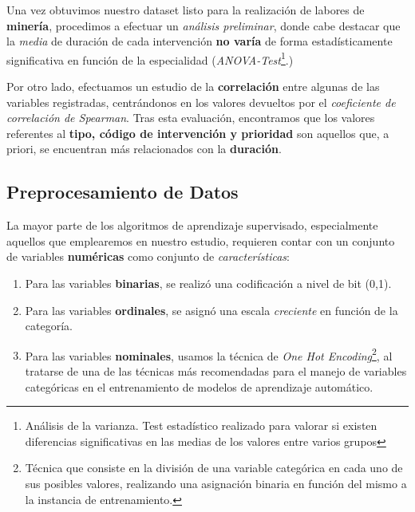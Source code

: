 

 Una vez obtuvimos nuestro dataset listo para la realización de labores de \textbf{minería}, procedimos a efectuar un \textit{análisis preliminar}, donde cabe destacar que la \textit{media} de duración de cada intervención \textbf{no varía} de forma estadísticamente significativa en función de la especialidad (\textit{ANOVA-Test}\footnote{Análisis de la varianza. Test estadístico realizado para valorar si existen diferencias significativas en las medias de los valores entre varios grupos}.)


 Por otro lado, efectuamos un estudio de la \textbf{correlación} entre algunas de las variables registradas, centrándonos en los valores devueltos por el \textit{coeficiente de correlación de Spearman}\cite{Page1963OrderedRanks}. 
 Tras esta evaluación, encontramos que los valores referentes al \textbf{tipo, código de intervención y prioridad} son aquellos que, a priori, se encuentran más relacionados con la \textbf{duración}.



 \subsection{Preprocesamiento de Datos}

 La mayor parte de los algoritmos de aprendizaje supervisado, especialmente aquellos que emplearemos en nuestro estudio, requieren contar con un conjunto de variables \textbf{numéricas} como conjunto de \textit{características}:
 
 \begin{enumerate}
     \item Para las variables \textbf{binarias}, se realizó una codificación a nivel de bit (0,1).
     \item Para las variables \textbf{ordinales}, se asignó una escala \textit{creciente} en función de la categoría.
     \item Para las variables \textbf{nominales}, usamos la técnica de \textit{One Hot Encoding}\footnote{Técnica que consiste en la división de una variable categórica en cada uno de sus posibles valores, realizando una asignación binaria en función del mismo a la instancia de entrenamiento.}, al tratarse de una de las técnicas más recomendadas para el manejo de variables categóricas en el entrenamiento de modelos de aprendizaje automático\cite{Potdar2017AClassifiers}.
 \end{enumerate}

